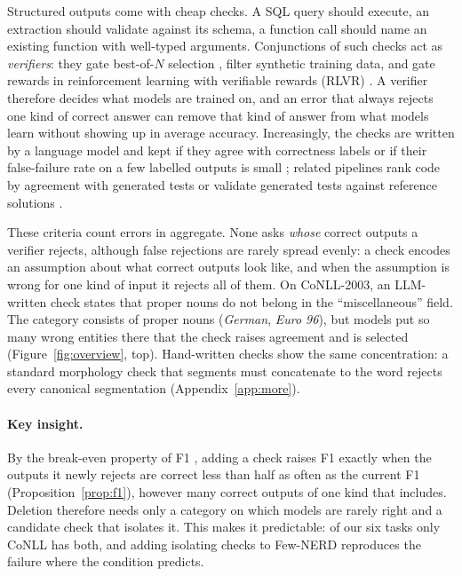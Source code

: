 \documentclass[11pt]{article}
\begin{document}
Structured outputs come with cheap checks. A SQL query should execute, an
extraction should validate against its schema, a function call should name
an existing function with well-typed arguments. Conjunctions of such checks
act as \emph{verifiers}: they gate best-of-$N$ selection
\citep{snell2024scaling,brown2024monkeys,stroebl2024verifier}, filter
synthetic training data, and gate rewards in reinforcement learning with
verifiable rewards (RLVR) \citep{shao2024deepseekmath,tinyv2025}. A verifier
therefore decides what models are trained on, and an error that always
rejects one kind of correct answer can remove that kind of answer from what
models learn without showing up in average accuracy. Increasingly, the
checks are written by a language model and kept if they agree with
correctness labels \citep{autopyverifier2026,shankar2024validators} or if
their false-failure rate on a few labelled outputs is small
\citep{shankar2024spade}; related pipelines rank code by agreement with
generated tests \citep{chen2023codet} or validate generated tests against
reference solutions \citep{hardtests2025}.

These criteria count errors in aggregate. None asks \emph{whose} correct
outputs a verifier rejects, although false rejections are rarely spread
evenly: a check encodes an assumption about what correct outputs look
like, and when the assumption is wrong for one kind of input it rejects
all of them. On CoNLL-2003, an LLM-written check states that proper nouns
do not belong in the ``miscellaneous'' field. The category consists of
proper nouns (\emph{German}, \emph{Euro 96}), but models put so many wrong
entities there that the check raises agreement and is selected
(Figure~\ref{fig:overview}, top).
Hand-written checks show the same concentration: a standard morphology
check that segments must concatenate to the word rejects every
canonical segmentation (Appendix~\ref{app:more}).

\paragraph{Key insight.} By the break-even property of F1
\citep{zhao2013beyond,lipton2014optimal}, adding a check raises F1 exactly
when the outputs it newly rejects are correct less than half as often as
the current F1 (Proposition~\ref{prop:f1}), however many correct outputs of
one kind that includes. Deletion therefore needs only a category on which
models are rarely right and a candidate check that isolates it. This makes
it predictable: of our six tasks only CoNLL has both, and adding isolating
checks to Few-NERD reproduces the failure where the condition predicts.
\end{document}
